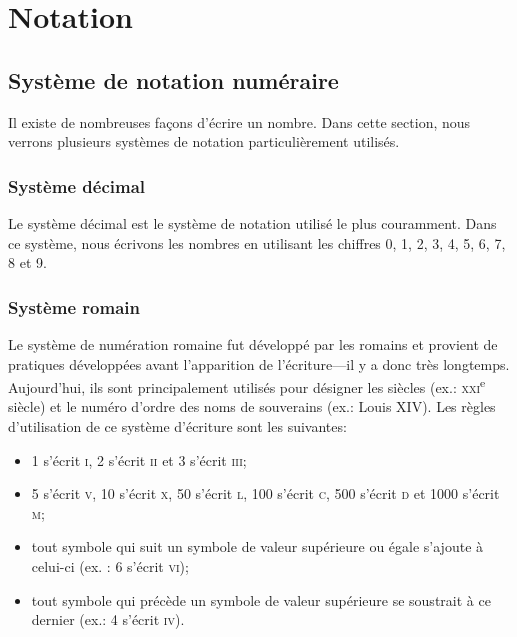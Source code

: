 \chapter{Notation}

\section{Système de notation numéraire}

Il existe de nombreuses façons d'écrire un nombre. Dans cette section, nous verrons plusieurs systèmes de notation particulièrement utilisés.

\subsection{Système décimal}

Le système décimal est le système de notation utilisé le plus couramment. Dans ce système, nous écrivons les nombres en utilisant les chiffres 0, 1, 2, 3, 4, 5, 6, 7, 8 et 9.



\subsection{Système romain}

Le système de numération romaine fut développé par les romains et provient de pratiques développées avant l'apparition de l'écriture---il y a donc très longtemps. Aujourd'hui, ils sont principalement utilisés pour désigner les siècles (ex.: \textsc{xxi}\textsuperscript{e} siècle) et le numéro d'ordre des noms de souverains (ex.: Louis XIV). Les règles d'utilisation de ce système d'écriture sont les suivantes:
\begin{itemize}
	\item 1 s'écrit \textsc{i}, 2 s'écrit \textsc{ii} et 3 s'écrit \textsc{iii};
	\item 5 s'écrit \textsc{v}, 10 s'écrit \textsc{x}, 50 s'écrit \textsc{l}, 100 s'écrit \textsc{c}, 500 s'écrit \textsc{d} et 1000 s'écrit \textsc{m};
	\item tout symbole qui suit un symbole de valeur supérieure ou égale s'ajoute à celui-ci (ex. : 6 s'écrit \textsc{vi});
	\item tout symbole qui précède un symbole de valeur supérieure se soustrait à ce dernier (ex.: 4 s'écrit \textsc{iv}).
\end{itemize}

